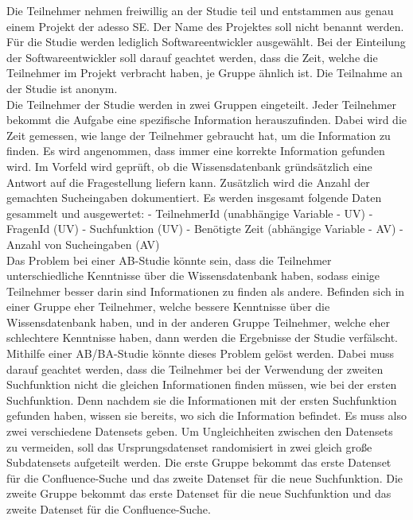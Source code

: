 Die Teilnehmer nehmen freiwillig an der Studie teil und entstammen aus genau einem Projekt der adesso SE.
Der Name des Projektes soll nicht benannt werden.
Für die Studie werden lediglich Softwareentwickler ausgewählt.
Bei der Einteilung der Softwareentwickler soll darauf geachtet werden, dass die Zeit, welche die Teilnehmer im Projekt verbracht haben, je Gruppe ähnlich ist.
Die Teilnahme an der Studie ist anonym.\\

Die Teilnehmer der Studie werden in zwei Gruppen eingeteilt.
Jeder Teilnehmer bekommt die Aufgabe eine spezifische Information herauszufinden.
Dabei wird die Zeit gemessen, wie lange der Teilnehmer gebraucht hat, um die Information zu finden.
Es wird angenommen, dass immer eine korrekte Information gefunden wird.
Im Vorfeld wird geprüft, ob die Wissensdatenbank gründsätzlich eine Antwort auf die Fragestellung liefern kann. 
Zusätzlich wird die Anzahl der gemachten Sucheingaben dokumentiert.
Es werden insgesamt folgende Daten gesammelt und ausgewertet:
-	TeilnehmerId (unabhängige Variable - UV)
-	FragenId (UV)
-	Suchfunktion (UV)
-	Benötigte Zeit (abhängige Variable - AV)
-	Anzahl von Sucheingaben (AV)\\

Das Problem bei einer AB-Studie könnte sein, dass die Teilnehmer unterschiedliche Kenntnisse über die Wissensdatenbank haben, sodass einige Teilnehmer besser darin sind Informationen zu finden als andere.
Befinden sich in einer Gruppe eher Teilnehmer, welche bessere Kenntnisse über die Wissensdatenbank haben, und in der anderen Gruppe Teilnehmer, welche eher schlechtere Kenntnisse haben, dann werden die Ergebnisse der Studie verfälscht.
Mithilfe einer AB/BA-Studie könnte dieses Problem gelöst werden.
Dabei muss darauf geachtet werden, dass die Teilnehmer bei der Verwendung der zweiten Suchfunktion nicht die gleichen Informationen finden müssen, wie bei der ersten Suchfunktion.
Denn nachdem sie die Informationen mit der ersten Suchfunktion gefunden haben, wissen sie bereits, wo sich die Information befindet.
Es muss also zwei verschiedene Datensets geben.
Um Ungleichheiten zwischen den Datensets zu vermeiden, soll das Ursprungsdatenset randomisiert in zwei gleich große Subdatensets aufgeteilt werden.
Die erste Gruppe bekommt das erste Datenset für die Confluence-Suche und das zweite Datenset für die neue Suchfunktion.
Die zweite Gruppe bekommt das erste Datenset für die neue Suchfunktion und das zweite Datenset für die Confluence-Suche.\\

